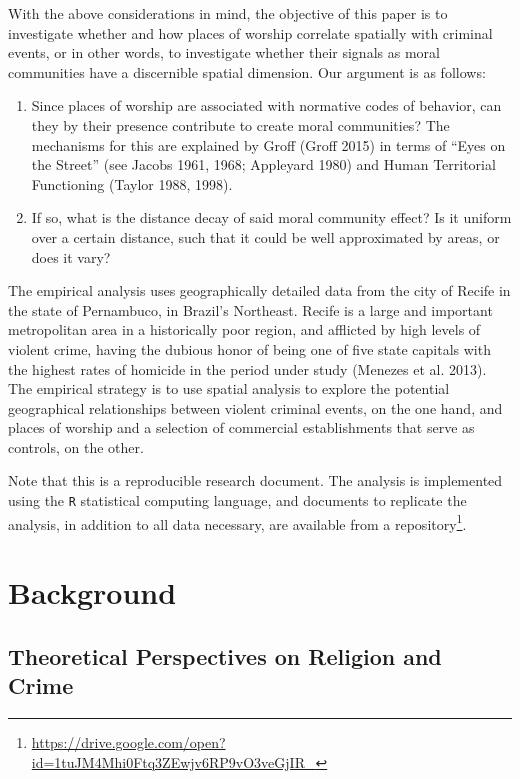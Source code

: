 \documentclass[smallextended]{svjour3}       %
\begin{document}
With the above considerations in mind, the objective of this paper is to
investigate whether and how places of worship correlate spatially with
criminal events, or in other words, to investigate whether their signals
as moral communities have a discernible spatial dimension. Our argument
is as follows:

\begin{enumerate}
\def\labelenumi{\arabic{enumi}.}
\item
  Since places of worship are associated with normative codes of
  behavior, can they by their presence contribute to create moral
  communities? The mechanisms for this are explained by Groff (Groff
  2015) in terms of ``Eyes on the Street'' (see Jacobs 1961, 1968;
  Appleyard 1980) and Human Territorial Functioning (Taylor 1988, 1998).
\item
  If so, what is the distance decay of said moral community effect? Is
  it uniform over a certain distance, such that it could be well
  approximated by areas, or does it vary?
\end{enumerate}

The empirical analysis uses geographically detailed data from the city
of Recife in the state of Pernambuco, in Brazil's Northeast. Recife is a
large and important metropolitan area in a historically poor region, and
afflicted by high levels of violent crime, having the dubious honor of
being one of five state capitals with the highest rates of homicide in
the period under study (Menezes et al. 2013). The empirical strategy is
to use spatial analysis to explore the potential geographical
relationships between violent criminal events, on the one hand, and
places of worship and a selection of commercial establishments that
serve as controls, on the other.

Note that this is a reproducible research document. The analysis is
implemented using the \texttt{R} statistical computing language, and
documents to replicate the analysis, in addition to all data necessary,
are available from a
repository\footnote{\url{https://drive.google.com/open?id=1tuJM4Mhi0Ftq3ZEwjv6RP9vO3veGjIR_}}.

\hypertarget{background}{%
\section{Background}\label{background}}

\hypertarget{theoretical-perspectives-on-religion-and-crime}{%
\subsection{Theoretical Perspectives on Religion and
Crime}\label{theoretical-perspectives-on-religion-and-crime}}
\end{document}
